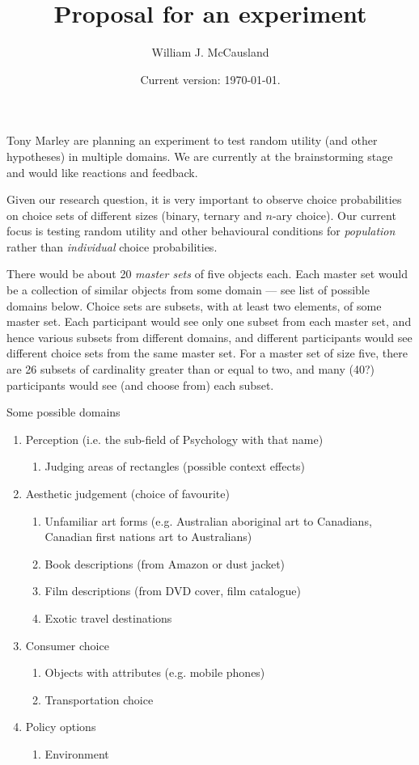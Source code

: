 \documentclass[11pt,letter]{amsart}
\begin{document}
\title{Proposal for an experiment}
\author{William J. McCausland}
\date{Current version: \today.}

\maketitle

Tony Marley are planning an experiment to test random utility (and other hypotheses) in multiple domains.
We are currently at the brainstorming stage and would like reactions and feedback.

Given our research question, it is very important to observe choice probabilities on choice sets of different sizes (binary, ternary and $n$-ary choice).
Our current focus is testing random utility and other behavioural conditions for {\em population} rather than {\em individual} choice probabilities.

There would be about 20 {\em master sets} of five objects each.
Each master set would be a collection of similar objects from some domain --- see list of possible domains below.
Choice sets are subsets, with at least two elements, of some master set.
Each participant would see only one subset from each master set, and hence various subsets from different domains, and different participants would see different choice sets from the same master set.
For a master set of size five, there are 26 subsets of cardinality greater than or equal to two, and many (40?) participants would see (and choose from) each subset.

Some possible domains
\begin{enumerate}
	\item Perception (i.e. the sub-field of Psychology with that name)
	\begin{enumerate}
		\item Judging areas of rectangles (possible context effects)
	\end{enumerate}
	\item Aesthetic judgement (choice of favourite)
	\begin{enumerate}
		\item Unfamiliar art forms
		(e.g. Australian aboriginal art to Canadians, Canadian first nations art to Australians)
		\item Book descriptions (from Amazon or dust jacket)
		\item Film descriptions (from DVD cover, film catalogue)
		\item Exotic travel destinations
	\end{enumerate}
	\item Consumer choice
	\begin{enumerate}
		\item Objects with attributes (e.g. mobile phones)
		\item Transportation choice
	\end{enumerate}
	\item Policy options
	\begin{enumerate}
		\item Environment
	\end{enumerate}
\end{enumerate}
\end{document}
